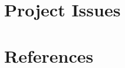 \documentclass[11pt, a4paper]{article}
\begin{document}
\pagebreak
\section{Project Issues}




\pagebreak
\section{References}
\end{document}
